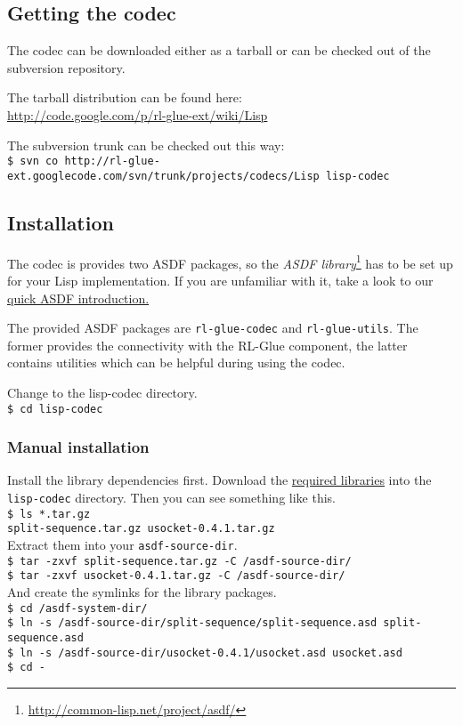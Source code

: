 \documentclass[11pt,a4paper,dvipdfm]{article}
\newcommand{\selfref}[1]{\href{#1}{#1}}
\newcommand{\footref}[2]{\textsl{#1}\footnote{\selfref{#2}}}
\newcommand{\prompttext}[1]{\texttt{#1}}
\newcommand{\shprompt}[1]{\prompttext{\$ #1}}
\begin{document}
\subsection{Getting the codec}

The codec can be downloaded either as a tarball or can be checked out of the
subversion repository.

The tarball distribution can be found here: \\
\selfref{http://code.google.com/p/rl-glue-ext/wiki/Lisp}

The subversion trunk can be checked out this way: \\
\shprompt{svn co
          http://rl-glue-ext.googlecode.com/svn/trunk/projects/codecs/Lisp
          lisp-codec}

\subsection{Installation}

The codec is provides two ASDF packages, so the
\footref{ASDF library}{http://common-lisp.net/project/asdf/} has to be set up
for your Lisp implementation. If you are unfamiliar with it, take a look to
our \hyperlink{asdfintro}{quick ASDF introduction.}

The provided ASDF packages are \prompttext{rl-glue-codec} and
\prompttext{rl-glue-utils}. The former provides the connectivity with the
RL-Glue component, the latter contains utilities which can be helpful during
using the codec.

Change to the lisp-codec directory. \\
\shprompt{cd lisp-codec}

\subsubsection{Manual installation}

Install the library dependencies first. Download the
\hyperlink{softreqs}{required libraries} into the \prompttext{lisp-codec} directory.
Then you can see something like this. \\
\shprompt{ls *.tar.gz} \\
\prompttext{split-sequence.tar.gz usocket-0.4.1.tar.gz} \\
Extract them into your \prompttext{asdf-source-dir}. \\
\shprompt{tar -zxvf split-sequence.tar.gz -C /asdf-source-dir/} \\
\shprompt{tar -zxvf usocket-0.4.1.tar.gz -C /asdf-source-dir/} \\
And create the symlinks for the library packages. \\
\shprompt{cd /asdf-system-dir/} \\
\shprompt{ln -s /asdf-source-dir/split-sequence/split-sequence.asd
          split-sequence.asd} \\
\shprompt{ln -s /asdf-source-dir/usocket-0.4.1/usocket.asd
          usocket.asd} \\
\shprompt{cd -}
\end{document}
